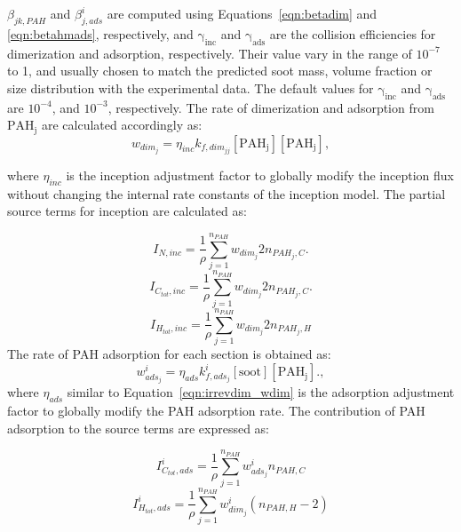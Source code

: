  \noindent $\beta_{jk,PAH}$ and $\beta^i_{j,ads}$ are computed using Equations~\eqref{eqn:betadim} and \eqref{eqn:betahmads}, respectively, and $\mathrm{\gamma_{inc}}$ and $\mathrm{\gamma_{ads}}$ are the collision efficiencies for dimerization and adsorption, respectively. Their value vary in the range of $\mathrm{10^{-7}}$ to 1, and usually chosen to match the predicted soot mass, volume fraction or size distribution with the experimental data. The default values for $\mathrm{\gamma_{inc}}$ and $\mathrm{\gamma_{ads}}$ are $10^{-4}$, and $10^{-3}$, respectively. The rate of dimerization and adsorption from $\mathrm{PAH_j}$ are calculated accordingly as:
\begin{equation}
	w_{dim_j} = \eta_{inc} k_{f,dim_{jj}} [\mathrm{PAH_j}] [\mathrm{PAH_j}],
	\label{eqn:irrevdim_wdim}
\end{equation}

 \noindent where $\eta_{inc}$ is the inception adjustment factor to globally modify the inception flux without changing the internal rate constants of the inception model. The partial source terms for inception are calculated as:

\begin{equation}
	I_{N,inc} =\frac{1}{\rho} \sum_{j=1}^{n_{PAH}} w_{dim_j} 2n_{PAH_j,C}.
	\label{eqn:INinc}
\end{equation}
\begin{equation}
	I_{C_{tot},inc} = \frac{1}{\rho}\sum_{j=1}^{n_{PAH}} w_{dim_j} 2n_{PAH_j,C}.
	\label{eqn:ICtotinc}
\end{equation}
\begin{equation}
	I_{H_{tot},inc} =\frac{1}{\rho} \sum_{j=1}^{n_{PAH}} w_{dim_j} 2n_{PAH_j,H}
	\label{eqn:IHtotinc}
\end{equation}
The rate of PAH adsorption for each section is obtained as:
\begin{equation}
	w^i_{ads_j} = \eta_{ads} k^i_{f,ads_{j}} [\mathrm{soot}] [\mathrm{PAH_j}].
	\label{eqn:adsrate_irrevdim},
\end{equation}
   \noindent where $\eta_{ads}$ similar to Equation~\eqref{eqn:irrevdim_wdim} is the adsorption adjustment factor to globally modify the PAH adsorption rate. The contribution of PAH adsorption to the source terms are expressed as:

\begin{equation}
	I^i_{C_{tot},ads} = \frac{1}{\rho}\sum_{j=1}^{n_{PAH}} w^i_{ads_j} n_{PAH,C}
	\label{eqn:ICtotads}
\end{equation}
\begin{equation}
	I^i_{H_{tot},ads} =\frac{1}{\rho} \sum_{j=1}^{n_{PAH}} w^i_{dim_j} (n_{PAH,H}-2)
	\label{eqn:IHtotads}
\end{equation}


